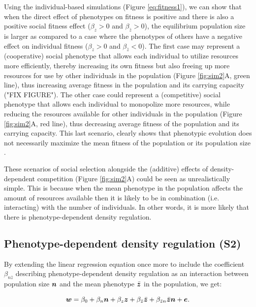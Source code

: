 \documentclass{article}
\begin{document}
Using the individual-based simulations (Figure \ref{eq:fitness1}), we can show that when the direct effect of phenotypes on fitness is positive and there is also a positive social fitness effect ($\beta_{z}>0$ and $\beta_{\bar{z}}>0$), the equilibrium population size is larger as compared to a case where the phenotypes of others have a negative effect on individual fitness ($\beta_{z}>0$ and $\beta_{\bar{z}}<0$). The first case may represent a (cooperative) social phenotype that allows each individual to utilize resources more efficiently, thereby increasing its own fitness but also freeing up more resources for use by other individuals in the population (Figure \ref{fig:sim2}A, green line), thus increasing average fitness in the population and its carrying capacity ("FIX FIGURE"). The other case could represent a (competitive) social phenotype that allows each individual to monopolize more resources, while reducing the resources available for other individuals in the population (Figure \ref{fig:sim2}A, red line), thus decreasing average fitness of the population and its carrying capacity. This last scenario, clearly shows that phenotypic evolution does not necessarily maximize the mean fitness of the population or its population size \citep{Wright1969, Abrams1993}.

These scenarios of social selection alongside the (additive) effects of density-dependent competition (Figure \ref{fig:sim2}A) could be seen as unrealistically simple. This is because when the mean phenotype in the population affects the amount of resources available then it is likely to be in combination (i.e. interacting) with the number of individuals. In other words, it is more likely that there is phenotype-dependent density regulation. 

\subsection{Phenotype-dependent density regulation (S2)}

By extending the linear regression equation once more to include the coefficient $\beta_{n \bar{z}}$ describing phenotype-dependent density regulation as an interaction between population size $\vectorsym{n}$ and the mean phenotype $\bar{\vectorsym{z}}$ in the population, we get: 

\begin{equation} \label{eq: PDDR}
\vectorsym{w}=\beta_{0} +\beta_{n} \vectorsym{n} + \beta_{z} \vectorsym{z}+ \beta_{\bar{z}} \bar{\vectorsym{z}} + \beta_{\bar{z}n} \bar{\vectorsym{z}} \vectorsym{n}  +  \vectorsym{e}.
\end{equation}
\end{document}
